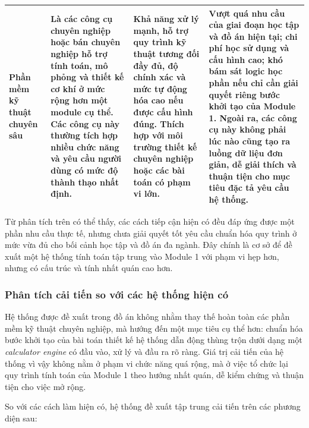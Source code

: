\documentclass[a4paper]{article}
\begin{document}
\begin{longtable}{|>{\raggedright\arraybackslash}p{3.2cm}|>{\raggedright\arraybackslash}p{4.0cm}|>{\raggedright\arraybackslash}p{4.0cm}|>{\raggedright\arraybackslash}p{4.3cm}|}
Phần mềm kỹ thuật chuyên sâu &
Là các công cụ chuyên nghiệp hoặc bán chuyên nghiệp hỗ trợ tính toán, mô phỏng và thiết kế cơ khí ở mức rộng hơn một module cụ thể. Các công cụ này thường tích hợp nhiều chức năng và yêu cầu người dùng có mức độ thành thạo nhất định. &
Khả năng xử lý mạnh, hỗ trợ quy trình kỹ thuật tương đối đầy đủ, độ chính xác và mức tự động hóa cao nếu được cấu hình đúng. Thích hợp với môi trường thiết kế chuyên nghiệp hoặc các bài toán có phạm vi lớn. &
Vượt quá nhu cầu của giai đoạn học tập và đồ án hiện tại; chi phí học sử dụng và cấu hình cao; khó bám sát logic học phần nếu chỉ cần giải quyết riêng bước khởi tạo của Module 1. Ngoài ra, các công cụ này không phải lúc nào cũng tạo ra luồng dữ liệu đơn giản, dễ giải thích và thuận tiện cho mục tiêu đặc tả yêu cầu hệ thống. \\ \hline

\end{longtable}

Từ phân tích trên có thể thấy, các cách tiếp cận hiện có đều đáp ứng được một phần nhu cầu thực tế, nhưng chưa giải quyết tốt yêu cầu chuẩn hóa quy trình ở mức vừa đủ cho bối cảnh học tập và đồ án đa ngành. Đây chính là cơ sở để đề xuất một hệ thống tính toán tập trung vào Module 1 với phạm vi hẹp hơn, nhưng có cấu trúc và tính nhất quán cao hơn.

\subsubsection{Phân tích cải tiến so với các hệ thống hiện có}
Hệ thống được đề xuất trong đồ án không nhằm thay thế hoàn toàn các phần mềm kỹ thuật chuyên nghiệp, mà hướng đến một mục tiêu cụ thể hơn: chuẩn hóa bước khởi tạo của bài toán thiết kế hệ thống dẫn động thùng trộn dưới dạng một \textit{calculator engine} có đầu vào, xử lý và đầu ra rõ ràng. Giá trị cải tiến của hệ thống vì vậy không nằm ở phạm vi chức năng quá rộng, mà ở việc tổ chức lại quy trình tính toán của Module 1 theo hướng nhất quán, dễ kiểm chứng và thuận tiện cho việc mở rộng.

So với các cách làm hiện có, hệ thống đề xuất tập trung cải tiến trên các phương diện sau:
\end{document}
